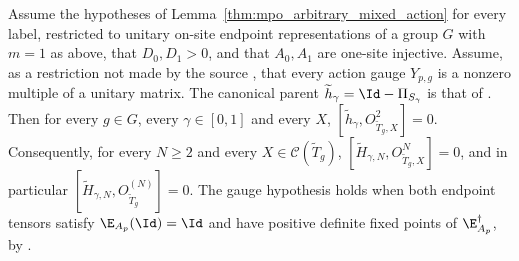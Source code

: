 \begin{lemma}
    \label{thm:mpo_arbitrary_parent_commutation_unitary_group}
    \leanok
    Assume the hypotheses of Lemma~\ref{thm:mpo_arbitrary_mixed_action}
    for every label, restricted to unitary on-site endpoint representations
    of a group $G$ with $m=1$ as above, that $D_0,D_1>0$, and that
    $A_0,A_1$ are one-site injective. Assume, as a restriction not made by
    the source \cite{gap:glm23_mixed_path_parent_commutation}, that every
    action gauge $Y_{p,g}$ is a nonzero multiple of a unitary matrix. The
    canonical parent $\widetilde h_\gamma=\Id-\Pi_{S_\gamma}$ is that of
    \cite[Section~5]{GarreRubio2023MPOSym}. Then for every $g\in G$,
    every $\gamma\in[0,1]$ and
    every $X$, $[\widetilde h_\gamma,O^2_{\widetilde T_g,X}]=0$.
    Consequently, for every $N\geq2$ and every
    $X\in\mathcal C(\widetilde T_g)$,
    $[\widetilde H_{\gamma,N},O^N_{\widetilde T_g,X}]=0$, and in particular
    $[\widetilde H_{\gamma,N},O^{(N)}_{\widetilde T_g}]=0$. The gauge
    hypothesis holds when both endpoint tensors satisfy
    $\E_{A_p}(\Id)=\Id$ and have positive definite fixed points of
    $\E_{A_p}^\dagger$, by
    \cite[Lemma~1 and Theorem~2]{PerezGarcia2008StringOrder}.
\end{lemma}
